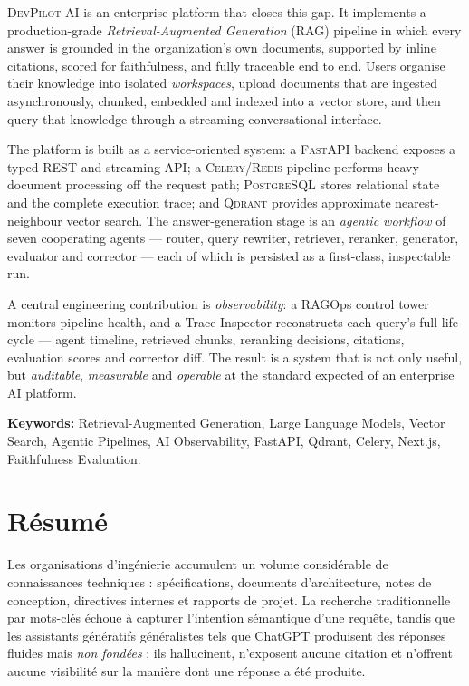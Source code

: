 \documentclass[12pt,a4paper,oneside]{report}
\newcommand{\devpilot}{\textsc{DevPilot AI}}
\begin{document}
\devpilot{} is an enterprise platform that closes this gap. It implements a
production-grade \emph{Retrieval-Augmented Generation} (RAG) pipeline in which
every answer is grounded in the organization's own documents, supported by
inline citations, scored for faithfulness, and fully traceable end to end. Users
organise their knowledge into isolated \emph{workspaces}, upload documents that
are ingested asynchronously, chunked, embedded and indexed into a vector store,
and then query that knowledge through a streaming conversational interface.

The platform is built as a service-oriented system: a \textsc{FastAPI} backend
exposes a typed REST and streaming API; a \textsc{Celery}/\textsc{Redis}
pipeline performs heavy document processing off the request path;
\textsc{PostgreSQL} stores relational state and the complete execution trace;
and \textsc{Qdrant} provides approximate nearest-neighbour vector search. The
answer-generation stage is an \emph{agentic workflow} of seven cooperating
agents — router, query rewriter, retriever, reranker, generator, evaluator and
corrector — each of which is persisted as a first-class, inspectable run.

A central engineering contribution is \emph{observability}: a RAGOps control
tower monitors pipeline health, and a Trace Inspector reconstructs each query's
full life cycle — agent timeline, retrieved chunks, reranking decisions,
citations, evaluation scores and corrector diff. The result is a system that is
not only useful, but \emph{auditable}, \emph{measurable} and \emph{operable} at
the standard expected of an enterprise AI platform.

\noindent\textbf{Keywords:} Retrieval-Augmented Generation, Large Language
Models, Vector Search, Agentic Pipelines, AI Observability, FastAPI, Qdrant,
Celery, Next.js, Faithfulness Evaluation.

\chapter*{Résumé}

Les organisations d'ingénierie accumulent un volume considérable de connaissances
techniques : spécifications, documents d'architecture, notes de conception,
directives internes et rapports de projet. La recherche traditionnelle par
mots-clés échoue à capturer l'intention sémantique d'une requête, tandis que les
assistants génératifs généralistes tels que ChatGPT produisent des réponses
fluides mais \emph{non fondées} : ils hallucinent, n'exposent aucune citation et
n'offrent aucune visibilité sur la manière dont une réponse a été produite.
\end{document}
